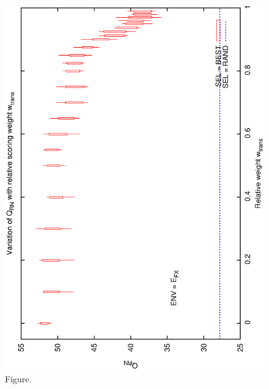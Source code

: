 \documentclass[12pt,a4paper]{article}
\begin{document}
\begin{figure}[htbp]
 \begin{center}
  \includegraphics[scale=1.0, angle=0]{figures/cs1_dw2_rn.eps}
 \end{center}
  \caption[Figure.]
{Figure.}
\end{figure}
\clearpage
\end{document}
